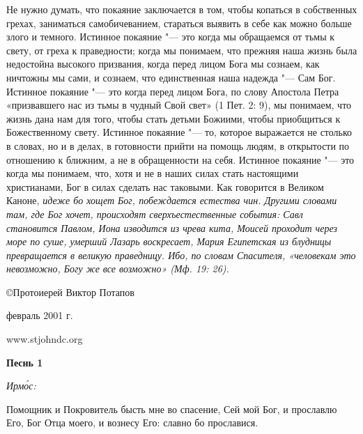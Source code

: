 Не нужно думать, что покаяние заключается в том,
чтобы копаться в собственных грехах, заниматься
самобичеванием, стараться выявить в себе как
можно больше злого и темного. Истинное покаяние
"--- это когда мы обращаемся от тьмы к свету, от
греха к праведности; когда мы понимаем, что
прежняя наша жизнь была недостойна высокого
призвания, когда перед лицом Бога мы сознаем, как
ничтожны мы сами, и сознаем, что единственная
наша надежда "--- Сам Бог. Истинное покаяние "--- это
когда перед лицом Бога, по слову Апостола Петра
«призвавшего нас из тьмы в чудный Свой свет» (1
Пет. 2: 9), мы понимаем, что жизнь дана нам для того,
чтобы стать детьми Божиими, чтобы приобщиться к
Божественному свету. Истинное покаяние "--- то,
которое выражается не столько в словах, но и в
делах, в готовности прийти на помощь людям, в
открытости по отношению к ближним, а не в
обращенности на себя. Истинное покаяние "--- это
когда мы понимаем, что, хотя и не в наших силах
стать настоящими христианами, Бог в силах
сделать нас таковыми. Как говорится в Великом
Каноне, \itshape идеже бо хощет Бог, побеждается
естества чин\normalfont{}. Другими словами там, где Бог
хочет, происходят сверхъестественные события:
Савл становится Павлом, Иона изводится из чрева
кита, Моисей проходит через море по суше, умерший
Лазарь воскресает, Мария Египетская из блудницы
превращается в великую праведницу. Ибо, по словам
Спасителя, «человекам это невозможно, Богу же все
возможно» (Мф. 19: 26). 


©Протоиерей Виктор Потапов


февраль 2001 г.


www.stjohndc.org



\mychapterending





\mychapterending








\bfseries Песнь 1\normalfont{}


\itshape Ирмо́с:\normalfont{}


Помощник и Покровитель бысть мне во спасение, Сей мой Бог, и прославлю Его, Бог Отца моего, и вознесу Его: славно бо прославися.


